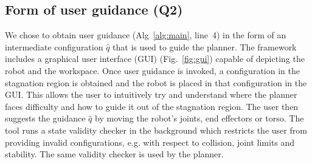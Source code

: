 \documentclass{article}
\begin{document}


%
%


\subsection{Form of user guidance (Q2)}
\label{sec:q2}
We chose to obtain user guidance 
(Alg~\ref{alg:main}, line~4)
in the form of an intermediate configuration $\hat{q}$ that is used to guide the planner. 
%
The framework includes a graphical user interface (GUI) (Fig.~\ref{fig:gui}) capable of  depicting the robot and the workspace.
Once user guidance is invoked, 
a configuration in the stagnation region is obtained and the robot is placed in that configuration in the GUI.
This allows the user to intuitively try and understand where the planner faces difficulty and how to guide it out of the stagnation region.
The user then suggests the guidance $\hat{q}$ by moving the robot's joints, end effectors or torso.
The tool runs a state validity checker in the background which restricts the user from providing invalid configurations, e.g. with respect to collision, joint limits and stability. The same validity checker is used by the planner.
\end{document}
